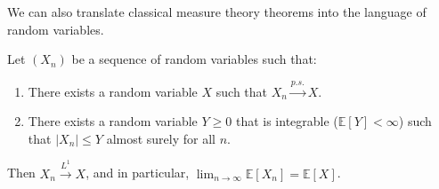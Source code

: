 We can also translate classical measure theory theorems into the language of random variables.%
\begin{example}
Let $(X_n)$ be a sequence of random variables such that:
\begin{enumerate}
    \item There exists a random variable $X$ such that $X_n \xrightarrow{p.s.} X$.
    \item There exists a random variable $Y \geq 0$ that is integrable ($\mathbb{E}[Y] < \infty$) such that $|X_n| \leq Y$ almost surely for all $n$.
\end{enumerate}
Then $X_n \xrightarrow{L^1} X$, and in particular, $\lim_{n \to \infty} \mathbb{E}[X_n] = \mathbb{E}[X]$.
\end{example}%
